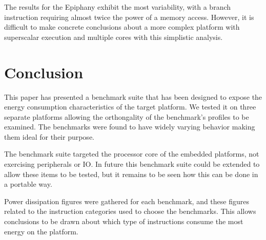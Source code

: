 \documentclass[twocolumn]{article}
\newcommand{\todo}[1]{\textbf{\textcolor{red}{#1}}}
\begin{document}
The results for the Epiphany exhibit the most variability, with a branch instruction requiring almost twice the power of a memory access. However, it is difficult to make concrete conclusions about a more complex platform with superscalar execution and multiple cores with this simplistic analysis.





\section{Conclusion}

This paper has presented a benchmark suite that has been designed to expose the energy consumption characteristics of the target platform. We tested it on three separate platforms allowing the orthongality of the benchmark's profiles to be examined. The benchmarks were found to have widely varying behavior making them ideal for their purpose.

The benchmark suite targeted the processor core of the embedded platforms, not exercising peripherals or IO. In future this benchmark suite could be extended to allow these items to be tested, but it remains to be seen how this can be done in a portable way.

Power dissipation figures were gathered for each benchmark, and these figures related to the instruction categories used to choose the benchmarks. This allows conclusions to be drawn about which type of instructions consume the most energy on the platform.

\printbibliography
\end{document}
